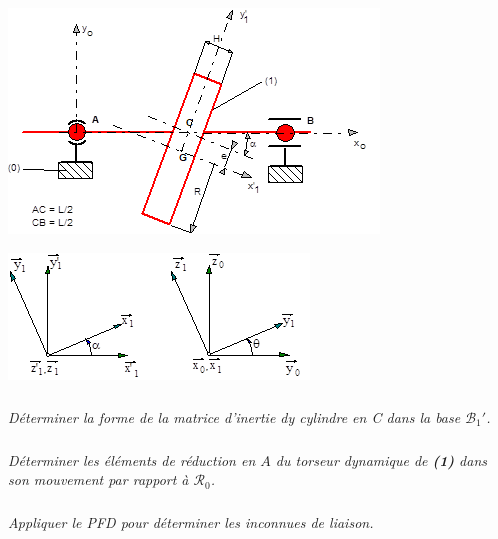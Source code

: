 \documentclass[10pt,fleqn]{article} %
\begin{document}
\begin{multicols}{2}
\begin{center}
\includegraphics[width=\linewidth]{images/fig_01}
\end{center}
\begin{center}
\includegraphics[width=\linewidth]{images/fig_02}
\end{center}

\subparagraph{}\textit{Déterminer la forme de la matrice d'inertie dy cylindre en C dans la base $\mathcal{B}_1'$.}

\subparagraph{}\textit{Déterminer les éléments de réduction en $A$ du torseur dynamique de \textbf{(1)} dans son mouvement par rapport à $\mathcal{R}_0$.}

\subparagraph{}\textit{Appliquer le PFD pour déterminer les inconnues de liaison.}

\ifprof
\else
\end{multicols}
\fi


\newpage
\end{document}
